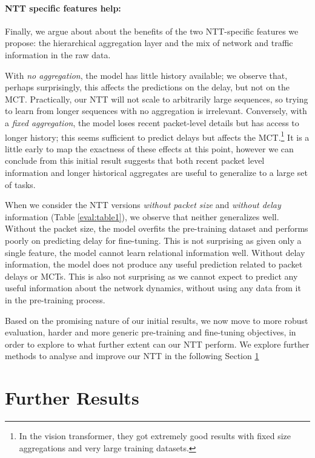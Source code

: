 \paragraph*{NTT specific features help:}
Finally, we argue about about the benefits of the two NTT-specific features we propose: \ie the hierarchical aggregation layer and the mix of network and traffic information in the raw data.

With \emph{no aggregation}, the model has little history available; we observe that, perhaps surprisingly, this affects the predictions on the delay, but not on the MCT. Practically, our NTT will not scale to arbitrarily large sequences, so trying to learn from longer sequences with no aggregation is irrelevant. Conversely, with a \emph{fixed aggregation}, the model loses recent packet-level details but has access to longer history; this seems sufficient to predict delays but affects the MCT.\footnote{In the vision transformer\cite{dosovitskiyImageWorth16x162021}, they got extremely good results with fixed size aggregations and very large training datasets.} It is a little early to map the exactness of these effects at this point, however we can conclude from this initial result suggests that both recent packet level information and longer historical aggregates are useful to generalize to a large set of tasks.


When we consider the NTT versions \emph{without packet size} and \emph{without delay} information (Table \ref{eval:table1}), we observe that neither generalizes well. Without the packet size, the model overfits the pre-training dataset and performs poorly on predicting delay for fine-tuning. This is not surprising as given only a single feature, the model cannot learn relational information well. Without delay information, the model does not produce any useful prediction related to packet delays or MCTs. This is also not surprising as we cannot expect to predict any useful information about the network dynamics, without using any data from it in the pre-training process.

Based on the promising nature of our initial results, we now move to more robust evaluation, harder and more generic pre-training and fine-tuning objectives, in order to explore to what further extent can our NTT perform. We explore further methods to analyse and improve our NTT in the following Section \ref{eval:fres}


\section{Further Results}
\label{eval:fres}


